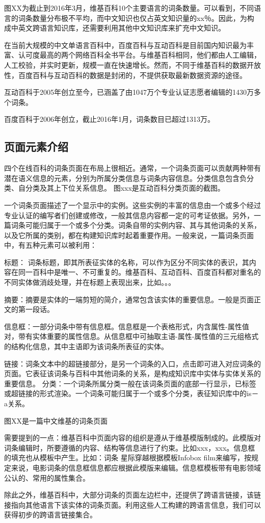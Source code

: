 图XX为截止到2016年3月，维基百科10个主要语言的词条数量。可以看到，不同语言的词条数量分布极不平均，而中文知识也仅占英文知识量的xx％。因此，为构成中英文跨语言知识库，还需要利用其他中文知识库来扩充中文知识。

在当前大规模的中文单语言百科中，百度百科与互动百科是目前国内知识最为丰富、认可度最高的两个网络百科全书平台。与维基百科相同，他们都由人工编辑，人工校验，并实时更新，规模一直在快速增长。然而，不同于维基百科的数据开放性，百度百科与互动百科的数据是封闭的，不提供获取最新数据资源的途径。

互动百科于2005年创立至今，已涵盖了由1047万个专业认证志愿者编辑的1430万多个词条。

百度百科于2006年创立，截止2016年1月，词条数目已超过1313万。

\subsection{页面元素介绍}

四个在线百科的词条页面在布局上很相近。通常，一个词条页面可以贡献两种带有潜在语义信息的元素，分别为所属分类信息与词条内容信息。分类信息包含负分类、自分类及其上下位关系信息。 图xxx是互动百科分类页面的截图。

一个词条页面描述了一个显示中的实例。这些实例的丰富的信息由一个或多个经过专业认证的编写者们创建或修改，一般其信息内容都一定的可考证依据。另外，一篇词条可能归属于一个或多个分类。词条自带的实例内容、其与其他词条的关系，以及它所属的类别，都在构建知识库时起着重要作用。一般来说，一篇词条页面中，有五种元素可以被利用：

{\heiti 标题：} 词条标题，即其所表征实体的名称，可以作为区分不同实体的表识，其内容在同一百科中是唯一、不可重复的。维基百科、互动百科、百度百科都对重名的不同实体做消歧处理，并在标题上表现出来，比如。。。

{\heiti 摘要：}摘要是实体的一端剪短的简介，通常包含该实体的重要信息。一般是页面正文的第一段话。

{\heiti 信息框：}一部分词条中带有信息框。信息框是一个表格形式，内含属性-属性值对，带有实体重要的属性信息。从信息框中可抽取主语-属性-属性值的三元组格式的结构化信息，其中主语即为该词条所表征的实体。

{\heiti 链接：}词条文本中的超链接部分，是另一个词条的入口，点击即可进入对应词条的页面。它表征该词条与百科中其他词条的关系，是构成知识库中实体与实体关系的重要信息。
分类：一个词条所属分类一般在该词条页面的底部一行显示，已标签或超链接的形式渲染。一个词条可能归属于一个或多个分类，表征知识库中的is－a关系。

图XX是一篇中文维基的词条页面

需要提到的一点：维基百科中页面内容的组织是遵从于维基模版制成的。此模版对词条编辑时，所要遵循的内容、结构等信息进行了约束。比如xxx，xxx。信息框的填充也从模板中产生。比如：词条 星际穿越根据模板Infobox film来编写，按规定来说，电影词条的信息框信息都应根据此模版来编辑。信息框模板带有电影领域公认的、常用的属性集合。

除此之外，维基百科中，大部分词条的页面左边栏中，还提供了跨语言链接，该链接指向其他语言下该实体的词条页面。利用这些人工构建的跨语言信息，我们可以获得初步的跨语言链接集合。

